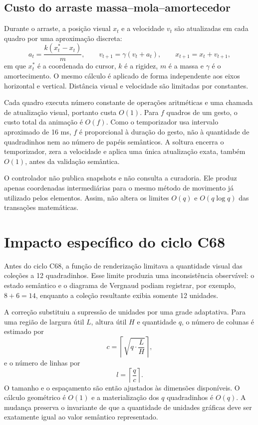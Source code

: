 \documentclass[12pt,a4paper]{article}
\begin{document}
\subsection{Custo do arraste massa--mola--amortecedor}
Durante o arraste, a posição visual $x_t$ e a velocidade $v_t$ são atualizadas em cada quadro por uma aproximação discreta:
\[
a_t = \frac{k(x^{*}_t-x_t)}{m},
\qquad
v_{t+1}=\gamma(v_t+a_t),
\qquad
x_{t+1}=x_t+v_{t+1},
\]
em que $x^{*}_t$ é a coordenada do cursor, $k$ é a rigidez, $m$ é a massa e $\gamma$ é o amortecimento. O mesmo cálculo é aplicado de forma independente aos eixos horizontal e vertical. Distância visual e velocidade são limitadas por constantes.

Cada quadro executa número constante de operações aritméticas e uma chamada de atualização visual, portanto custa $O(1)$. Para $f$ quadros de um gesto, o custo total da animação é $O(f)$. Como o temporizador usa intervalo aproximado de 16 ms, $f$ é proporcional à duração do gesto, não à quantidade de quadradinhos nem ao número de papéis semânticos. A soltura encerra o temporizador, zera a velocidade e aplica uma única atualização exata, também $O(1)$, antes da validação semântica.

O controlador não publica snapshots e não consulta a curadoria. Ele produz apenas coordenadas intermediárias para o mesmo método de movimento já utilizado pelos elementos. Assim, não altera os limites $O(q)$ e $O(q\log q)$ das transações matemáticas.



\section{Impacto específico do ciclo C68}

Antes do ciclo C68, a função de renderização limitava a quantidade visual das coleções a 12 quadradinhos. Esse limite produzia uma inconsistência observável: o estado semântico e o diagrama de Vergnaud podiam registrar, por exemplo, $8+6=14$, enquanto a coleção resultante exibia somente 12 unidades.

A correção substituiu a supressão de unidades por uma grade adaptativa. Para uma região de largura útil $L$, altura útil $H$ e quantidade $q$, o número de colunas é estimado por
\[
c=\left\lceil\sqrt{q\cdot\frac{L}{H}}\right\rceil,
\]
e o número de linhas por
\[
l=\left\lceil\frac{q}{c}\right\rceil.
\]
O tamanho e o espaçamento são então ajustados às dimensões disponíveis. O cálculo geométrico é $O(1)$ e a materialização dos $q$ quadradinhos é $O(q)$. A mudança preserva o invariante de que a quantidade de unidades gráficas deve ser exatamente igual ao valor semântico representado.
\end{document}
